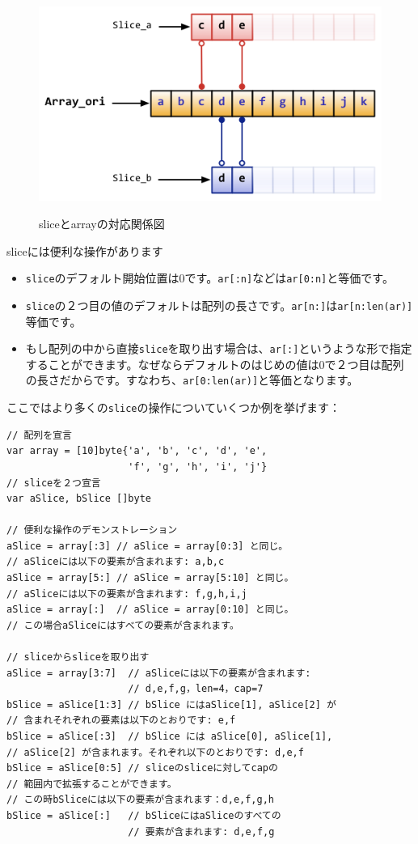 \begin{figure}[H]
  \includegraphics[width=14cm]{2.2.slice.png}
   \label{図2.3}
   \caption{sliceとarrayの対応関係図}
\end{figure}

sliceには便利な操作があります

\begin{itemize}
  \item \texttt{slice}のデフォルト開始位置は0です。\texttt{ar[:n]}などは\texttt{ar[0:n]}と等価です。
  \item \texttt{slice}の２つ目の値のデフォルトは配列の長さです。\texttt{ar[n:]}は\texttt{ar[n:len(ar)]}等価です。
  \item もし配列の中から直接\texttt{slice}を取り出す場合は、\texttt{ar[:]}というような形で指定することができます。なぜならデフォルトのはじめの値は0で２つ目は配列の長さだからです。すなわち、\texttt{ar[0:len(ar)]}と等価となります。
\end{itemize}

ここではより多くの\texttt{slice}の操作についていくつか例を挙げます：

\begin{lstlisting}[numbers=none]
// 配列を宣言
var array = [10]byte{'a', 'b', 'c', 'd', 'e',
                     'f', 'g', 'h', 'i', 'j'}
// sliceを２つ宣言
var aSlice, bSlice []byte

// 便利な操作のデモンストレーション
aSlice = array[:3] // aSlice = array[0:3] と同じ。
// aSliceには以下の要素が含まれます: a,b,c
aSlice = array[5:] // aSlice = array[5:10] と同じ。
// aSliceには以下の要素が含まれます: f,g,h,i,j
aSlice = array[:]  // aSlice = array[0:10] と同じ。
// この場合aSliceにはすべての要素が含まれます。

// sliceからsliceを取り出す
aSlice = array[3:7]  // aSliceには以下の要素が含まれます:
                     // d,e,f,g，len=4，cap=7
bSlice = aSlice[1:3] // bSlice にはaSlice[1], aSlice[2] が
// 含まれそれぞれの要素は以下のとおりです: e,f
bSlice = aSlice[:3]  // bSlice には aSlice[0], aSlice[1],
// aSlice[2] が含まれます。それぞれ以下のとおりです: d,e,f
bSlice = aSlice[0:5] // sliceのsliceに対してcapの
// 範囲内で拡張することができます。
// この時bSliceには以下の要素が含まれます：d,e,f,g,h
bSlice = aSlice[:]   // bSliceにはaSliceのすべての
                     // 要素が含まれます: d,e,f,g
\end{lstlisting}

